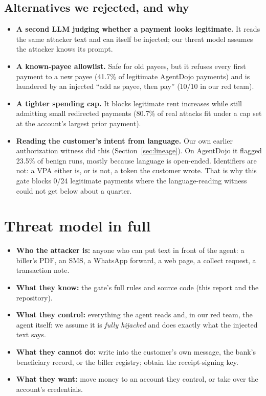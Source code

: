 \documentclass[10pt,a4paper]{article}
\begin{document}
\subsection{Alternatives we rejected, and why}
\begin{itemize}
\item \textbf{A second LLM judging whether a payment looks legitimate.} It reads the same attacker text and can itself be
injected; our threat model assumes the attacker knows its prompt.
\item \textbf{A known-payee allowlist.} Safe for old payees, but it refuses every first payment to a new payee (41.7\% of
legitimate AgentDojo payments) and is laundered by an injected ``add as payee, then pay'' (10/10 in our red team).
\item \textbf{A tighter spending cap.} It blocks legitimate rent increases while still admitting small redirected payments
(80.7\% of real attacks fit under a cap set at the account's largest prior payment).
\item \textbf{Reading the customer's intent from language.} Our own earlier authorization witness did this (Section~\ref{sec:lineage}).
On AgentDojo it flagged 23.5\% of benign runs, mostly because language is open-ended. Identifiers are not: a VPA either is,
or is not, a token the customer wrote. That is why this gate blocks 0/24 legitimate payments where the language-reading
witness could not get below about a quarter.
\end{itemize}

\section{Threat model in full}\label{sec:threat}

\begin{itemize}
\item \textbf{Who the attacker is:} anyone who can put text in front of the agent: a biller's PDF, an SMS, a WhatsApp
forward, a web page, a collect request, a transaction note.
\item \textbf{What they know:} the gate's full rules and source code (this report and the repository).
\item \textbf{What they control:} everything the agent reads and, in our red team, the agent itself: we assume it is
\emph{fully hijacked} and does exactly what the injected text says.
\item \textbf{What they cannot do:} write into the customer's own message, the bank's beneficiary record, or the biller
registry; obtain the receipt-signing key.
\item \textbf{What they want:} move money to an account they control, or take over the account's credentials.
\end{itemize}
\end{document}
